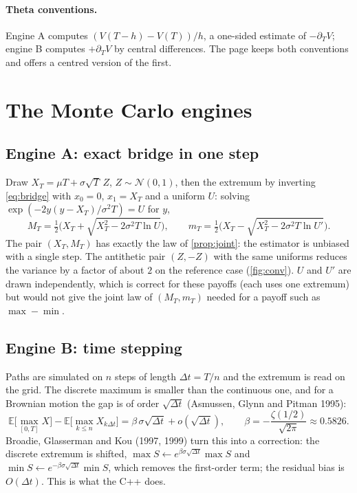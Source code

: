 \documentclass[11pt,a4paper]{article}
\theoremstyle{remark}
\newcommand{\E}{\mathbb{E}}
\begin{document}
\paragraph{Theta conventions.} Engine A computes $(V(T-h)-V(T))/h$, a one-sided estimate of $-\partial_TV$; engine B computes
$+\partial_TV$ by central differences. The page keeps both conventions and offers a centred version of the first.

\section{The Monte Carlo engines}\label{sec:mc}
\subsection{Engine A: exact bridge in one step}
Draw $X_T=\mu T+\sigma\sqrt T\,Z$, $Z\sim\mathcal N(0,1)$, then the extremum by inverting \eqref{eq:bridge} with $x_0=0$,
$x_1=X_T$ and a uniform $U$: solving $\exp(-2y(y-X_T)/\sigma^2T)=U$ for $y$,
\begin{equation}\label{eq:inverse}
  M_T=\tfrac12\Big(X_T+\sqrt{X_T^2-2\sigma^2T\ln U}\Big),\qquad m_T=\tfrac12\Big(X_T-\sqrt{X_T^2-2\sigma^2T\ln U'}\Big).
\end{equation}
The pair $(X_T,M_T)$ has exactly the law of \cref{prop:joint}: the estimator is unbiased with a single step. The antithetic
pair $(Z,-Z)$ with the same uniforms reduces the variance by a factor of about $2$ on the reference case (\cref{fig:conv}).
$U$ and $U'$ are drawn independently, which is correct for these payoffs (each uses one extremum) but would not give the joint
law of $(M_T,m_T)$ needed for a payoff such as $\max-\min$.

\subsection{Engine B: time stepping}
Paths are simulated on $n$ steps of length $\Delta t=T/n$ and the extremum is read on the grid. The discrete maximum is
smaller than the continuous one, and for a Brownian motion the gap is of order $\sqrt{\Delta t}$ (Asmussen, Glynn and Pitman
1995):
\begin{equation}
  \E\Big[\max_{[0,T]}X\Big]-\E\Big[\max_{k\le n}X_{k\Delta t}\Big]=\beta\,\sigma\sqrt{\Delta t}+o(\sqrt{\Delta t}),\qquad
  \beta=-\frac{\zeta(1/2)}{\sqrt{2\pi}}\approx0.5826.
\end{equation}
Broadie, Glasserman and Kou (1997, 1999) turn this into a correction: the discrete extremum is shifted,
$\max S\leftarrow e^{\beta\sigma\sqrt{\Delta t}}\max S$ and $\min S\leftarrow e^{-\beta\sigma\sqrt{\Delta t}}\min S$, which removes the
first-order term; the residual bias is $O(\Delta t)$. This is what the C++ does.
\end{document}
